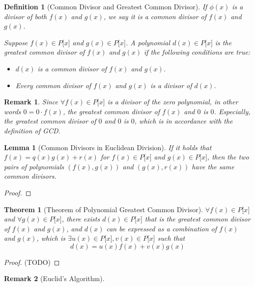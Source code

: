\documentclass[onecolumn]{ctexart}
\newtheorem{definition}{Definition}
\newtheorem{theorem}{Theorem}
\newtheorem{lemma}{Lemma}
\newtheorem{remark}{Remark}
\begin{document}
\begin{definition}[Common Divisor and Greatest Common Divisor]
  If $\phi(x)$ is a divisor of both $f(x)$ and $g(x)$, we say it is a common 
  divisor of $f(x)$ and $g(x)$.

  Suppose $f(x) \in P\lbrack x \rbrack$ and $g(x) \in P\lbrack x \rbrack$. A 
  polynomial $d(x) \in P\lbrack x \rbrack$ is the greatest common divisor of 
  $f(x)$ and $g(x)$ if the following conditions are true:
  \begin{itemize}
    \item $d(x)$ is a common divisor of $f(x)$ and $g(x)$.
    \item Every common divisor of $f(x)$ and $g(x)$ is a divisor of $d(x)$.
  \end{itemize}
\end{definition}
\begin{remark}
  Since $\forall f(x) \in P\lbrack x \rbrack$ is a divisor of the zero 
  polynomial, in other words $0 = 0 \cdot f(x)$, the greatest common divisor of 
  $f(x)$ and $0$ is $0$. Especially, the greatest common divisor of $0$ and $0$ 
  is $0$, which is in accordance with the definition of GCD.
\end{remark}

\begin{lemma}[Common Divisors in Euclidean Division]
  If it holds that $f(x) = q(x)g(x) + r(x)$ for $f(x) \in P\lbrack x \rbrack$ 
  and $g(x) \in P\lbrack x \rbrack$, then the two pairs of polynomials $(f(x), 
  g(x))$ and $(g(x), r(x))$ have the same common divisors.
\end{lemma}
\begin{proof}
  
\end{proof}

\begin{theorem}[Theorem of Polynomial Greatest Common Divisor]
  $\forall f(x) \in P\lbrack x \rbrack$ and $\forall g(x) \in P\lbrack x \rbrack$, 
  there exists $d(x) \in P\lbrack x \rbrack$ that is the greatest common divisor 
  of $f(x)$ and $g(x)$, and $d(x)$ can be expressed as a combination of $f(x)$ 
  and $g(x)$, which is $\exists u(x) \in P\lbrack x \rbrack, v(x) \in P\lbrack x 
  \rbrack$ such that
  \[
    d(x) = u(x)f(x) + v(x)g(x)
  \]
\end{theorem}
\begin{proof}
  (TODO)
\end{proof}

\begin{remark}[Euclid's Algorithm]
  
\end{remark}
\end{document}
